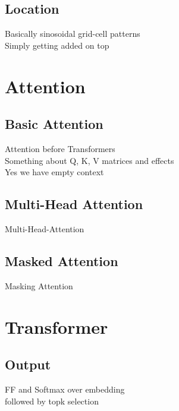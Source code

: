 \subsection{Location}
\begin{frame}[c]
    Basically sinosoidal grid-cell patterns \\
    Simply getting added on top
\end{frame}


\section{Attention}

\subsection{Basic Attention}
\begin{frame}[c]
    Attention before Transformers \\
    Something about Q, K, V matrices and effects \\
    Yes we have empty context
\end{frame}

\subsection{Multi-Head Attention}
\begin{frame}[c]
    Multi-Head-Attention
\end{frame}

\subsection{Masked Attention}
\begin{frame}[c]
    Masking Attention
\end{frame}


\section{Transformer}

\subsection{Output}
\begin{frame}[c]
    FF and Softmax over embedding \\
    followed by topk selection
\end{frame}

